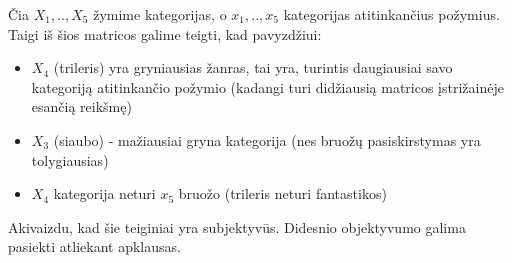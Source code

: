 \documentclass{VUMIFInfMagistrinis}
\begin{document}
Čia $X_1, .., X_5$ žymime kategorijas, o $x_1, .., x_5$ kategorijas atitinkančius požymius. Taigi iš šios matricos galime teigti, kad pavyzdžiui:
\begin{itemize}
	\item $X_4$ (trileris) yra gryniausias žanras, tai yra, turintis daugiausiai savo kategoriją atitinkančio požymio (kadangi turi didžiausią matricos įstrižainėje esančią reikšmę)
	\item $X_3$ (siaubo) - mažiausiai gryna kategorija (nes bruožų pasiskirstymas yra tolygiausias)
	\item $X_4$ kategorija neturi $x_5$ bruožo (trileris neturi fantastikos)
\end{itemize} 
Akivaizdu, kad šie teiginiai yra subjektyvūs. Didesnio objektyvumo galima pasiekti atliekant apklausas.
\end{document}
